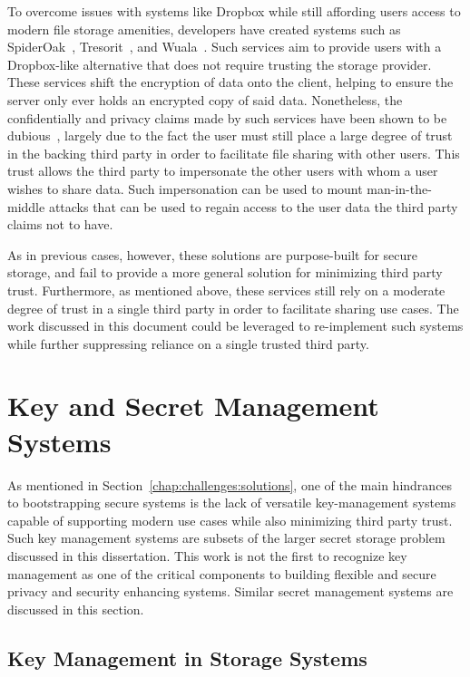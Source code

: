 To overcome issues with systems like Dropbox while still affording
users access to modern file storage amenities, developers have created
systems such as SpiderOak~\cite{spideroak}, Tresorit~\cite{tresorit},
and Wuala~\cite{wuala}. Such services aim to provide users with a
Dropbox-like alternative that does not require trusting the storage
provider. These services shift the encryption of data onto the client,
helping to ensure the server only ever holds an encrypted copy of said
data. Nonetheless, the confidentially and privacy claims made by such
services have been shown to be dubious~\cite{wilson2014}, largely due
to the fact the user must still place a large degree of trust in the
backing third party in order to facilitate file sharing with other
users. This trust allows the third party to impersonate the other
users with whom a user wishes to share data. Such impersonation can be
used to mount man-in-the-middle attacks that can be used to regain
access to the user data the third party claims not to have.

As in previous cases, however, these solutions are purpose-built for
secure storage, and fail to provide a more general solution for
minimizing third party trust. Furthermore, as mentioned above, these
services still rely on a moderate degree of trust in a single third
party in order to facilitate sharing use cases. The work discussed in
this document could be leveraged to re-implement such systems while
further suppressing reliance on a single trusted third party.

\section{Key and Secret Management Systems}
\label{chap:related:keymgmt}

As mentioned in Section~\ref{chap:challenges:solutions}, one of the
main hindrances to bootstrapping secure systems is the lack of
versatile key-management systems capable of supporting modern use
cases while also minimizing third party trust. Such key management
systems are subsets of the larger secret storage problem discussed in
this dissertation. This work is not the first to recognize key
management as one of the critical components to building flexible and
secure privacy and security enhancing systems. Similar secret
management systems are discussed in this section.

\subsection{Key Management in Storage Systems}

